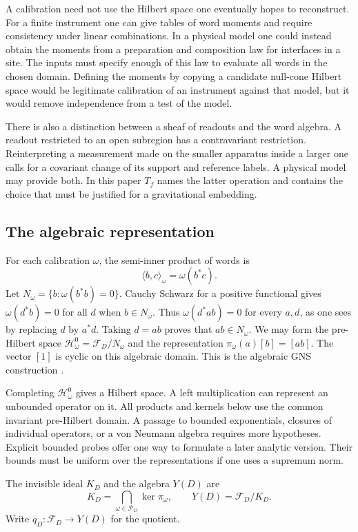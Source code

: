 \documentclass[11pt,letterpaper]{article}
\newcommand{\F}{\mathcal F}
\newcommand{\Probes}{\mathcal P}
\begin{document}
A calibration need not use the Hilbert space one eventually hopes to reconstruct. For a finite instrument one can give tables of word moments and require consistency under linear combinations. In a physical model one could instead obtain the moments from a preparation and composition law for interfaces in a site. The inputs must specify enough of this law to evaluate all words in the chosen domain. Defining the moments by copying a candidate null-cone Hilbert space would be legitimate calibration of an instrument against that model, but it would remove independence from a test of the model.

There is also a distinction between a sheaf of readouts and the word algebra. A readout restricted to an open subregion has a contravariant restriction. Reinterpreting a measurement made on the smaller apparatus inside a larger one calls for a covariant change of its support and reference labels. A physical model may provide both. In this paper $T_f$ names the latter operation and contains the choice that must be justified for a gravitational embedding.

\subsection{The algebraic representation}

For each calibration $\omega$, the semi-inner product of words is
\[
 \langle b,c\rangle_\omega=\omega(b^*c).
\]
Let $N_\omega=\{b:\omega(b^*b)=0\}$. Cauchy Schwarz for a positive functional gives $\omega(d^*b)=0$ for all $d$ when $b\in N_\omega$. Thus $\omega(d^*ab)=0$ for every $a,d$, as one sees by replacing $d$ by $a^*d$. Taking $d=ab$ proves that $ab\in N_\omega$. We may form the pre-Hilbert space $\mathcal H_\omega^0=\F_D/N_\omega$ and the representation $\pi_\omega(a)[b]=[ab]$. The vector $[1]$ is cyclic on this algebraic domain. This is the algebraic GNS construction \cite{gns}.

Completing $\mathcal H_\omega^0$ gives a Hilbert space. A left multiplication can represent an unbounded operator on it. All products and kernels below use the common invariant pre-Hilbert domain. A passage to bounded exponentials, closures of individual operators, or a von Neumann algebra requires more hypotheses. Explicit bounded probes offer one way to formulate a later analytic version. Their bounds must be uniform over the representations if one uses a supremum norm.

\begin{definition}
The invisible ideal $K_D$ and the algebra $Y(D)$ are
\begin{equation}
 K_D=\bigcap_{\omega\in\Probes_D}\ker\pi_\omega,\qquad
 Y(D)=\F_D/K_D .                                        \label{eq:local}
\end{equation}
Write $q_D:\F_D\to Y(D)$ for the quotient.
\end{definition}
\end{document}
